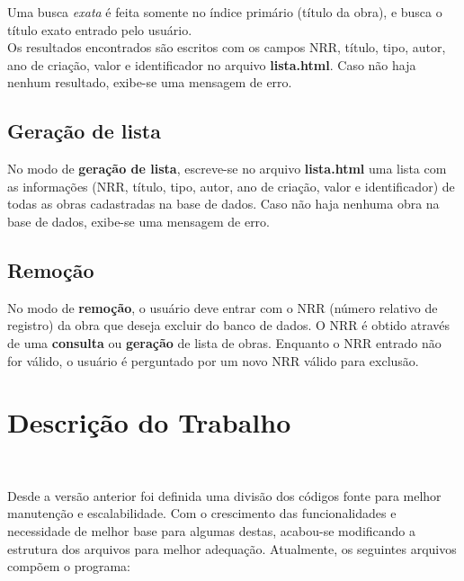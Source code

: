\documentclass{article}
\begin{document}
Uma busca \textit{exata} é feita somente no índice primário (título da obra), e busca o título exato entrado pelo usuário.\\

Os resultados encontrados são escritos com os campos NRR, título, tipo, autor, ano de criação, valor e identificador no arquivo \textbf{lista.html}. Caso não haja nenhum resultado, exibe-se uma mensagem de erro.

\subsection{Geração de lista}

No modo de \textbf{geração de lista}, escreve-se no arquivo \textbf{lista.html} uma lista com as informações (NRR, título, tipo, autor, ano de criação, valor e identificador) de todas as obras cadastradas na base de dados. Caso não haja nenhuma obra na base de dados, exibe-se uma mensagem de erro.

\subsection{Remoção}

No modo de \textbf{remoção}, o usuário deve entrar com o NRR (número relativo de registro) da obra que deseja excluir do banco de dados. O NRR é obtido através de uma \textbf{consulta} ou \textbf{geração} de lista de obras. Enquanto o NRR entrado não for válido, o usuário é perguntado por um novo NRR válido para exclusão.

\section{Descrição do Trabalho}\

Desde a versão anterior foi definida uma divisão dos códigos fonte para melhor manutenção e escalabilidade. Com o crescimento das funcionalidades e necessidade de melhor base para algumas destas, acabou-se modificando a estrutura dos arquivos para melhor adequação. Atualmente, os seguintes arquivos compõem o programa:
\end{document}
